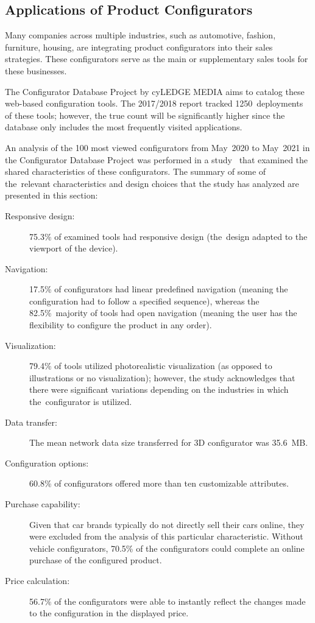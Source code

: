 \subsection{Applications of Product Configurators}

Many companies across multiple industries, such as automotive, fashion, furniture, housing, are integrating product configurators into their sales strategies. These configurators serve as the main or supplementary sales tools for these businesses.

The Configurator Database Project by cyLEDGE MEDIA aims to catalog these web-based configuration tools. The 2017/2018 report tracked 1250~deployments of these tools; however, the true count will be significantly higher since the database only includes the most frequently visited applications.~\cite{cyLEDGE2018}

An analysis of the 100 most viewed configurators from May~2020 to May~2021 in the Configurator Database Project was performed in a study~\cite{Blazek2023} that examined the shared characteristics of these configurators. The summary of some of the~relevant characteristics and design choices that the study has analyzed are presented in this section:
\begin{description}
    \item[Responsive design:] 75.3\% of examined tools had responsive design (the~design adapted to the viewport of the device).
    \item[Navigation:] 17.5\% of configurators had linear predefined navigation (meaning the configuration had to follow a specified sequence), whereas the 82.5\%~majority of tools had open navigation (meaning the user has the flexibility to configure the product in any order).
    \item[Visualization:] 79.4\% of tools utilized photorealistic visualization (as opposed to illustrations or no visualization); however, the study acknowledges that there were significant variations depending on the industries in which the~configurator is utilized.
    \item[Data transfer:] The mean network data size transferred for 3D configurator was 35.6~MB.
    \item[Configuration options:] 60.8\% of configurators offered more than ten customizable attributes.
    \item[Purchase capability:] Given that car brands typically do not directly sell their cars online, they were excluded from the analysis of this particular characteristic. Without vehicle configurators, 70.5\% of the configurators could complete an online purchase of the configured product.
    \item[Price calculation:] 56.7\% of the configurators were able to instantly reflect the changes made to the configuration in the displayed price.
\end{description}

